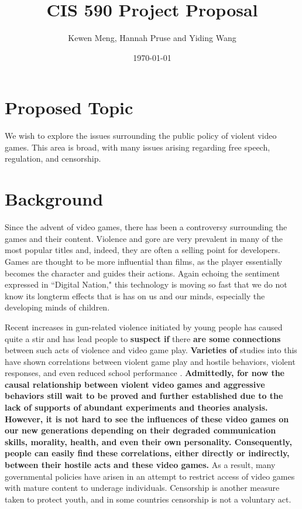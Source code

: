 \documentclass[12pt]{article}
\title{CIS 590 Project Proposal}
\author{Kewen Meng, Hannah Pruse and Yiding Wang}
\date{\today}
\begin{document}
\maketitle
\vspace{-10mm}
\section*{Proposed Topic}
We wish to explore the issues surrounding the public policy of violent video games. This area is broad, with many issues arising regarding free speech, regulation, and censorship. 

\section*{Background}
\indent\indent Since the advent of video games, there has been a controversy surrounding the games and their content. Violence and gore are very prevalent in many of the most popular titles and, indeed, they are often a selling point for developers. Games are thought to be more influential than films, as the player essentially becomes the character and guides their actions. Again echoing the sentiment expressed in ``Digital Nation," this technology is moving so fast that we do not know its longterm effects that is has on us and our minds, especially the developing minds of children.

Recent increases in gun-related violence initiated by young people has caused quite a stir and has lead people to \textbf{suspect if} there \textbf{are some connections} between such acts of violence and video game play. \textbf{Varieties of} studies into this have shown correlations between violent game play and hostile behaviors, violent responses, and even reduced school performance \cite{barlett2009, gentile2004, anderson2003}. \textbf{Admittedly, for now the causal relationship between violent video games and aggressive behaviors still wait to be proved and further established due to the lack of supports of abundant experiments and theories analysis. However, it is not hard to see the influences of these video games on our new generations depending on their degraded communication skills, morality, health, and even their own personality. Consequently, people can easily find these correlations, either directly or indirectly, between their hostile acts and these video games.} As a result, many governmental policies have arisen in an attempt to restrict access of video games with mature content to underage individuals. Censorship is another measure taken to protect youth, and in some countries censorship is not a voluntary act.
\end{document}
